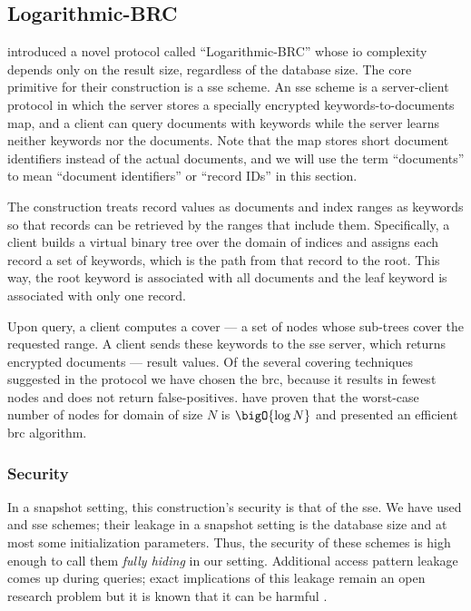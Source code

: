 \subsection{Logarithmic-BRC}

	\textcite{practical-range-search} introduced a novel protocol called ``Logarithmic-BRC'' whose \acrshort{io} complexity depends only on the result size, regardless of the database size.
	The core primitive for their construction is a \acrfull{sse} scheme.
	An \acrshort{sse} scheme is a server-client protocol in which the server stores a specially encrypted keywords-to-documents map, and a client can query documents with keywords while the server
	learns neither keywords nor the documents.
	Note that the map stores short document identifiers instead of the actual documents, and we will use the term ``documents'' to mean ``document identifiers'' or ``record IDs'' in this section.

	The construction treats record values as documents and index ranges as keywords so that records can be retrieved by the ranges that include them.
	Specifically, a client builds a virtual binary tree over the domain of indices and assigns each record a set of keywords, which is the path from that record to the root.
	This way, the root keyword is associated with all documents and the leaf keyword is associated with only one record.

	Upon query, a client computes a cover --- a set of nodes whose sub-trees cover the requested range.
	A client sends these keywords to the \acrshort{sse} server, which returns encrypted documents --- result values.
	Of the several covering techniques suggested in the protocol \cite{practical-range-search} we have chosen the \acrfull{brc}, because it results in fewest nodes and does not return false-positives.
	\textcite{brc} have proven that the worst-case number of nodes for domain of size $N$ is $\bigO{\log N}$ and presented an efficient \acrshort{brc} algorithm.

	\subsubsection{Security}
		In a snapshot setting, this construction's security is that of the \acrshort{sse}.
		We have used \cite{cjjkrs-13} and \cite{cjjjkrs-14} \acrshort{sse} schemes; their leakage in a snapshot setting is the database size and at most some initialization parameters.
		Thus, the security of these schemes is high enough to call them \emph{fully hiding} in our setting.
		Additional access pattern leakage comes up during queries; exact implications of this leakage remain an open research problem but it is known that it can be harmful \cite{generic-attacks-kellaris}.

